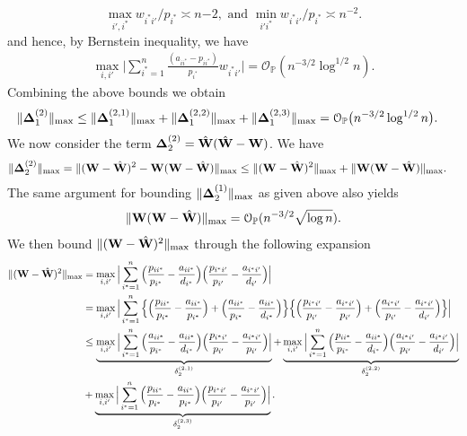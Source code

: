 \documentclass[10pt,journal,compsoc]{IEEEtran}
\newcommand{\op}{\mathcal{O}_{\mathbb{P}}}
\newcommand{\ee}{\end{aligned} \end{equation}}
\newcommand{\BL}{\Big (}
\newcommand{\BR}{\Big )}
\newcommand{\bee}{\begin{equation}\begin{aligned}}
\newcommand{\M}[1]{{{\mathbf{\MakeUppercase{#1}}}}}
\numberwithin{equation}{section}
\begin{document}
\begin{equation*}
\max_{i',i^*} w_{i^{*}{i'}}/{p_{i^*}} \asymp n{-2},\,\, \text{and} \,\, \min_{i'i^*}w_{i^{*}{i'}}/{p_{i^*}} \asymp n^{-2}.
\end{equation*}
and hence, by Bernstein inequality, we have
\bee\label{T1:d22}
\max_{i,{i'}}\Big|\sum_{i^* = 1}^n\frac{(a_{ii^*} - p_{ii^*})}{p_{i^*}}w_{i^{*}{i'}}\Big| = \op(n^{-3/2} \log^{1/2}{n}).
\ee
Combining the above bounds we obtain
\bee\label{T1:order_2_2}
\|\M \Delta_{1}^{(2)}\|_{\max} &\leq \|\M \Delta_{1}^{(2,1)}\|_{\max} + \|\M \Delta_{1}^{(2,2)}\|_{\max} + \|\M \Delta_{1}^{(2,3)}\|_{\max} 
= \op
\big(n^{-3/2}\log^{1/2}{n}\big).
\ee
We now consider the term $\M \Delta^{(2)}_2 = \hat{\M W}(\hat{\M W} -
\M W)$. We have
\bee
\|\M \Delta^{(2)}_2\|_{\max} &= \|(\M W - \hat{\M W})^2 - \M W(\M W - \hat{\M W})\|_{\max} 
\leq   \|(\M W - \hat{\M W})^2\|_{\max} + \|\M W(\M W - \hat{\M W})\|_{\max}.
\ee
The same argument for bounding $\|\M \Delta_2^{(1)}\|_{\max}$ as given above also yields
$$\|\M W(\M W - \hat{\M W})\|_{\max}  = \op(n^{-3/2}\sqrt{\log
  n}).$$
We then bound $\|(\M W - \hat{\M W})^2\|_{\max}$ through
the following expansion
\begin{equation}
\label{t:w:w-w2}
\begin{split}
\|(\M W - \hat{\M W})^2\|_{\max}
&= \max_{i,i'}\Big|\sum_{i^* = 1}^{n}\Big(\frac{p_{ii^*}}{p_{i^*}} -
\frac{a_{ii^*}}{d_{i^*}}\Big)
\Big(\frac{p_{i^*i'}}{p_{i'}} - \frac{a_{i^{*}{i'}}}{d_{i'}}\Big)\Big|
\\
&=\max_{i,i'}\Big|\sum_{i^* = 1}^{n}\Big\{\BL\frac{p_{ii^*}}{p_{i^*}} - \frac{a_{ii^*}}{p_{i^*}} \BR + \BL \frac{a_{ii^*}}{p_{i^*}} - \frac{a_{ii^*}}{d_{i^*}}
\BR\Big\}
\Big\{\BL\frac{p_{i^*i'}}{p_{i'}} - \frac{a_{i^{*}{i'}}}{p_{i'}} \BR + \BL \frac{a_{i^{*}{i'}}}{p_{i'}} - \frac{a_{i^{*}{i'}}}{d_{i'}}\BR\Big\}\Big|
\\
&\leq  \underbrace{\max_{i,{i'}}\Big|\sum_{i^{*}= 1}^n \BL \frac{a_{ii^*}}{p_{i^*}} - \frac{a_{ii^*}}{d_{i^*}}
\BR\BL\frac{p_{i^*i'}}{p_{i'}} - \frac{a_{i^{*}{i'}}}{p_{i'}} \BR\Big|}_{\delta^{(2,1)}_{2}} 
+\underbrace{\max_{i,{i'}}\Big|\sum_{i^* = 1}^{n}\Big(\frac{p_{ii^*}}{p_{i^*}} - \frac{a_{ii^*}}{d_{i^*}}\Big)\BL \frac{a_{i^{*}{i'}}}{p_{i'}} - \frac{a_{i^{*}{i'}}}{d_{i'}}\BR\Big|}_{ \delta^{(2,2)}_{2}}
\\
&+\underbrace{\max_{i,{i'}}\Big|\sum_{i^{*}= 1}^{n}\BL\frac{p_{ii^*}}{p_{i^*}} - \frac{a_{ii^*}}{p_{i^*}} \BR\BL\frac{p_{i^*i'}}{p_{i'}} - \frac{a_{i^{*}{i'}}}{p_{i'}} \BR\Big|}_{ \delta^{(2,3)}_{2}}.
\end{split}
\end{equation}
\end{document}
